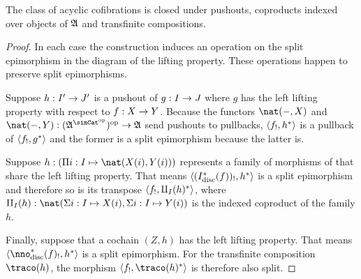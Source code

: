 \documentclass[csh.tex]{subfiles}
\begin{document}
\begin{lemma} The class of acyclic cofibrations is closed under pushouts, coproducts indexed over objects of $\mathfrak A$ and transfinite compositions. \label{saturation}\end{lemma}

\begin{proof}
In each case the construction induces an operation on the split epimorphism in the diagram of the lifting property. These operations happen to preserve split epimorphisms.

Suppose $h: I'\to J'$ is a pushout of $g: I\to J$ where $g$ has the left lifting property with respect to $f: X\to Y$. Because the functors $\nat(-,X)$ and $\nat(-,Y)\of(\ambient\s)\dual\to\ambient$ send pushouts to pullbacks, $\left\langle f_!,h^* \right\rangle$ is a pullback of $\left\langle f_!,g^* \right\rangle$ and the former is a split epimorphism because the latter is.

Suppose $h\of(\product{i\of I}{\nat(X(i),Y(i))})$ represents a family of morphisms of that share the left lifting property. That means $\left\langle (I_{\rm disc}^*(f))_!,h^* \right\rangle$ is a split epimorphism and therefore so is its transpose $\left\langle f_!,\amalg_I(h)^* \right\rangle$, where $\amalg_I(h)\of\nat(\coproduct{i\of I}{X(i)},\coproduct{i\of I}{Y(i)})$ is the indexed coproduct of the family $h$.%

Finally, suppose that a cochain $(Z,h)$ has the left lifting property. That means $\tuplet{\nno\disc\ri(f)_!,h\ri}$ is a split epimorphism. For the transfinite composition $\traco(h)$, the morphism $\tuplet{f_!,\traco(h)\ri}$ is therefore also split.
\end{proof}
\end{document}
